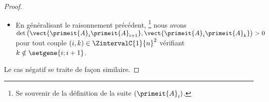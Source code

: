 \begin{proof}
\begin{itemize}
		\item En généralisant le raisonnement précédent,%
		\footnote{
		    Se souvenir de la définition  de la suite $(\primeit{A}_i)$.
		}
		nous avons
		$\det \big( \vect{\primeit{A}_i \primeit{A}_{i+1}}, \vect{\primeit{A}_i \primeit{A}_k} \big) > 0$
		pour tout couple $(i, k) \in \ZintervalC{1}{n}^2$ vérifiant $k \notin \setgene{i ; i+1}$.
	\end{itemize}

    \medskip
    
    \noindent
    Le cas négatif se traite de façon similaire.
\end{proof}


